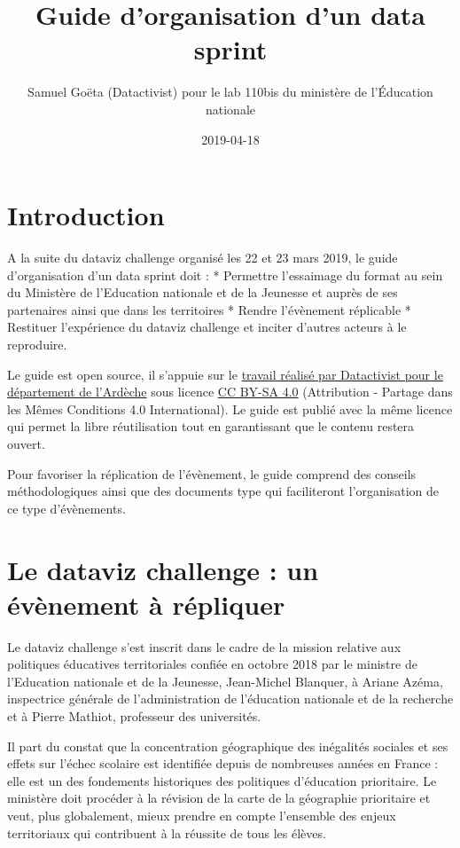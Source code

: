 \documentclass[]{book}
\title{Guide d'organisation d'un data sprint}
\author{Samuel Goëta (Datactivist) pour le lab 110bis du ministère de
l'Éducation nationale}
\date{2019-04-18}
\begin{document}
\maketitle

{
\setcounter{tocdepth}{1}
\tableofcontents
}
\chapter{Introduction}\label{introduction}

A la suite du dataviz challenge organisé les 22 et 23 mars 2019, le
guide d'organisation d'un data sprint doit : * Permettre l'essaimage du
format au sein du Ministère de l'Education nationale et de la Jeunesse
et auprès de ses partenaires ainsi que dans les territoires * Rendre
l'évènement réplicable * Restituer l'expérience du dataviz challenge et
inciter d'autres acteurs à le reproduire.

Le guide est open source, il s'appuie sur le
\href{https://docs.google.com/document/d/1uDw4Maifjl_egJ95y-F0dkXEyu2MNfhc2GvNEmjhPq8/edit\#heading=h.9ofnjz67swln}{travail
réalisé par Datactivist pour le département de l'Ardèche} sous licence
\href{https://creativecommons.org/licenses/by-sa/4.0/deed.fr}{CC BY-SA
4.0} (Attribution - Partage dans les Mêmes Conditions 4.0
International). Le guide est publié avec la même licence qui permet la
libre réutilisation tout en garantissant que le contenu restera ouvert.

Pour favoriser la réplication de l'évènement, le guide comprend des
conseils méthodologiques ainsi que des documents type qui faciliteront
l'organisation de ce type d'évènements.

\chapter{Le dataviz challenge : un évènement à répliquer}\label{dataviz}

Le dataviz challenge s'est inscrit dans le cadre de la mission relative
aux politiques éducatives territoriales confiée en octobre 2018 par le
ministre de l'Education nationale et de la Jeunesse, Jean-Michel
Blanquer, à Ariane Azéma, inspectrice générale de l'administration de
l'éducation nationale et de la recherche et à Pierre Mathiot, professeur
des universités.

Il part du constat que la concentration géographique des inégalités
sociales et ses effets sur l'échec scolaire est identifiée depuis de
nombreuses années en France : elle est un des fondements historiques des
politiques d'éducation prioritaire. Le ministère doit procéder à la
révision de la carte de la géographie prioritaire et veut, plus
globalement, mieux prendre en compte l'ensemble des enjeux territoriaux
qui contribuent à la réussite de tous les élèves.
\end{document}

